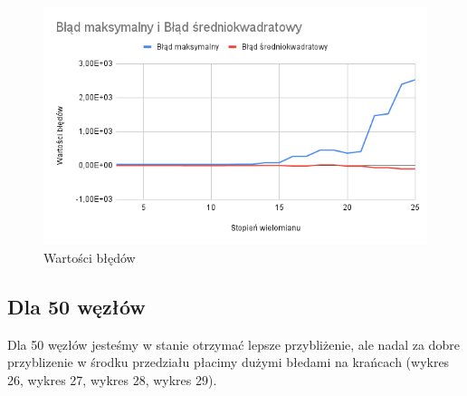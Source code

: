 \documentclass{article}
\begin{document}
\begin{figure}[H]
  \centering
  \begin{minipage}[b]{0.4\textwidth}
    \includegraphics[width=\textwidth]{img25.png}
    \caption{Wartości błędów}
  \end{minipage}
\end{figure}

\newpage

\subsection{Dla 50 węzłów}

Dla 50 węzłów jesteśmy w stanie otrzymać lepsze przybliżenie, ale nadal za dobre przyblizenie w środku przedziału płacimy dużymi błedami na krańcach (wykres 26, wykres 27, wykres 28, wykres 29).
\end{document}
